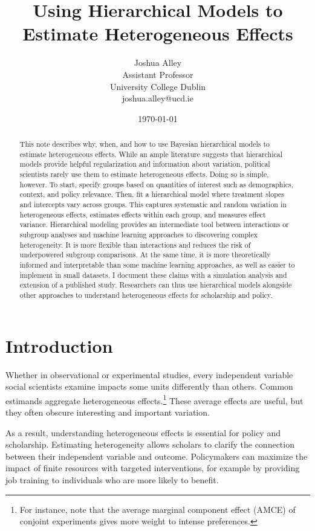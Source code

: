 \documentclass[12pt]{article}
\title{\textbf{Using Hierarchical Models to Estimate Heterogeneous Effects}}
\author{Joshua Alley \\
Assistant Professor \\
University College Dublin \\
joshua.alley@ucd.ie
}
\date{\today}
\begin{document}
\maketitle 

\begin{abstract} 
This note describes why, when, and how to use Bayesian hierarchical models to estimate heterogeneous effects. 
While an ample literature suggests that hierarchical models provide helpful regularization and information about variation, political scientists rarely use them to estimate heterogeneous effects. 
Doing so is simple, however. 
To start, specify groups based on quantities of interest such as demographics, context, and policy relevance.  
Then, fit a hierarchical model where treatment slopes and intercepts vary across groups.
This captures systematic and random variation in heterogeneous effects, estimates effects within each group, and measures effect variance. 
Hierarchical modeling provides an intermediate tool between interactions or subgroup analyses and machine learning approaches to discovering complex heterogeneity. 
It is more flexible than interactions and reduces the risk of underpowered subgroup comparisons.
At the same time, it is more theoretically informed and interpretable than some machine learning approaches, as well as easier to implement in small datasets. 
I document these claims with a simulation analysis and extension of a published study. 
Researchers can thus use hierarchical models alongside other approaches to understand heterogeneous effects for scholarship and policy.
\end{abstract} 


\newpage 
\doublespace 


\section{Introduction}


Whether in observational or experimental studies, every independent variable social scientists examine impacts some units differently than others. 
Common estimands aggregate heterogeneous effects.\footnote{For instance, \citet{Abramsonetal2022} note that the average marginal component effect (AMCE) of conjoint experiments gives more weight to intense preferences.} 
These average effects are useful, but they often obscure interesting and important variation. 


As a result, understanding heterogeneous effects is essential for policy and scholarship. 
Estimating heterogeneity allows scholars to clarify the connection between their independent variable and outcome.
Policymakers can maximize the impact of finite resources with targeted interventions, for example by providing job training to individuals who are more likely to benefit. 
\end{document}

